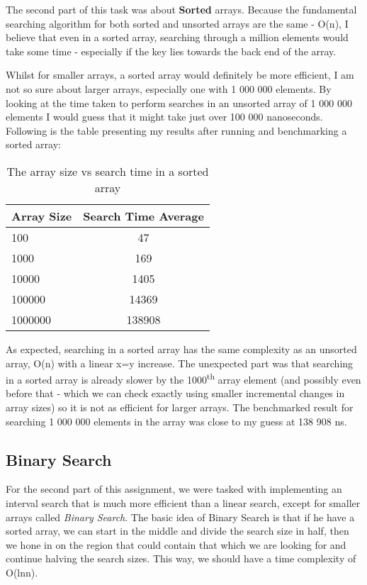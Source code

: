 \documentclass[a4paper,11pt]{article}
\begin{document}
The second part of this task was about {\bf Sorted} arrays. Because the fundamental searching algorithm for both sorted and unsorted arrays are the same - O(n), I believe that even in a sorted array, searching through a million elements would take some time - especially if the key lies towards the back end of the array. 

Whilst for smaller arrays, a sorted array would definitely be more efficient, I am not so sure about larger arrays, especially one with 1 000 000 elements. By looking at the time taken to perform searches in an unsorted array of 1 000 000 elements I would guess that it might take just over 100 000 nanoseconds. Following is the table presenting my results after running and benchmarking a sorted array:

\begin{table}[h]
\begin{center}
\begin{tabular}{l|c}
\textbf{Array Size} & \textbf{Search Time Average}\\
\hline
  100      &  47    \\
  1000     &  169   \\
  10000    &  1405   \\
  100000   &  14369  \\
  1000000  &  138908 \\

\end{tabular}
\caption{The array size vs search time in a sorted array}
\label{tab:table2}
\end{center}
\end{table}

As expected, searching in a sorted array has the same complexity as an unsorted array, O(n) with a linear x=y increase. The unexpected part was that searching in a sorted array is already slower by the 1000\textsuperscript{th} array element (and possibly even before that - which we can check exactly using smaller incremental changes in array sizes) so it is not as efficient for larger arrays. The benchmarked result for searching 1 000 000 elements in the array was close to my guess at 138 908 ns.

\subsection*{Binary Search}

For the second part of this assignment, we were tasked with implementing an interval search that is much more efficient than a linear search, except for smaller arrays called {\em Binary Search}. The basic idea of Binary Search is that if he have a sorted array, we can start in the middle and divide the search size in half, then we hone in on the region that could contain that which we are looking for and continue halving the search sizes. This way, we should have a time complexity of O(lnn).
\end{document}
